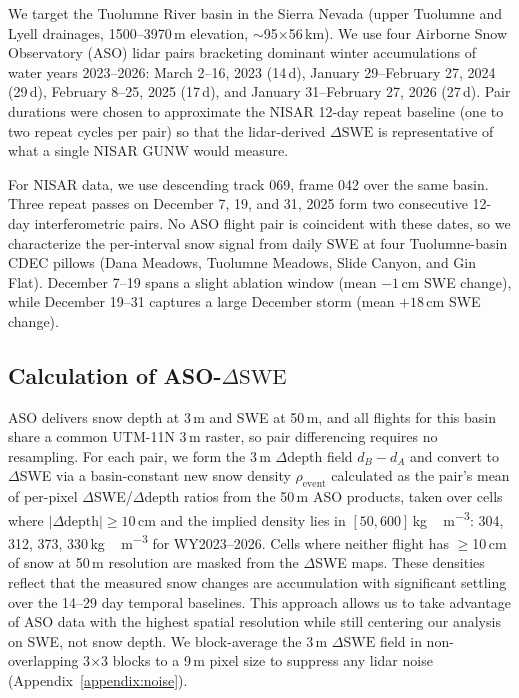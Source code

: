 \documentclass[tc, manuscript]{copernicus}
\begin{document}
We target the Tuolumne River basin in the Sierra Nevada (upper Tuolumne and Lyell drainages, 1500--3970\,\unit{m} elevation, $\sim$95$\times$56\,\unit{km}). We use four Airborne Snow Observatory (ASO) lidar pairs bracketing dominant winter accumulations of water years 2023--2026: March 2--16, 2023 (14\,\unit{d}), January 29--February 27, 2024 (29\,\unit{d}), February 8--25, 2025 (17\,\unit{d}), and January 31--February 27, 2026 (27\,\unit{d}). Pair durations were chosen to approximate the NISAR 12-day repeat baseline (one to two repeat cycles per pair) so that the lidar-derived $\Delta\mathrm{SWE}$ is representative of what a single NISAR GUNW would measure.

For NISAR data, we use descending track 069, frame 042 over the same basin. Three repeat passes on December 7, 19, and 31, 2025 form two consecutive 12-day interferometric pairs. No ASO flight pair is coincident with these dates, so we characterize the per-interval snow signal from daily SWE at four Tuolumne-basin CDEC pillows (Dana Meadows, Tuolumne Meadows, Slide Canyon, and Gin Flat). December 7--19 spans a slight ablation window (mean $-1$\,\unit{cm} SWE change), while December 19--31 captures a large December storm (mean $+18$\,\unit{cm} SWE change).

\subsection{Calculation of ASO-$\Delta\mathrm{SWE}$}\label{subsec:aso-phase}

ASO delivers snow depth at 3\,\unit{m} and SWE at 50\,\unit{m}, and all flights for this basin share a common UTM-11N 3\,\unit{m} raster, so pair differencing requires no resampling. For each pair, we form the 3\,\unit{m} $\Delta$depth field $d_B - d_A$ and convert to $\Delta$SWE via a basin-constant new snow density $\rho_\mathrm{event}$ calculated as the pair's mean of per-pixel $\Delta$SWE/$\Delta$depth ratios from the 50\,\unit{m} ASO products, taken over cells where $|\Delta\text{depth}|\geq10$\,\unit{cm} and the implied density lies in $[50, 600]$\,\unit{kg\,m^{-3}}: 304, 312, 373, 330\,\unit{kg\,m^{-3}} for WY2023--2026. Cells where neither flight has $\geq$10\,\unit{cm} of snow at 50\,\unit{m} resolution are masked from the $\Delta$SWE maps. These densities reflect that the measured snow changes are accumulation with significant settling over the 14--29 day temporal baselines. This approach allows us to take advantage of ASO data with the highest spatial resolution while still centering our analysis on SWE, not snow depth. We block-average the 3\,\unit{m} $\Delta\mathrm{SWE}$ field in non-overlapping 3$\times$3 blocks to a 9\,\unit{m} pixel size to suppress any lidar noise (Appendix~\ref{appendix:noise}).
\end{document}
